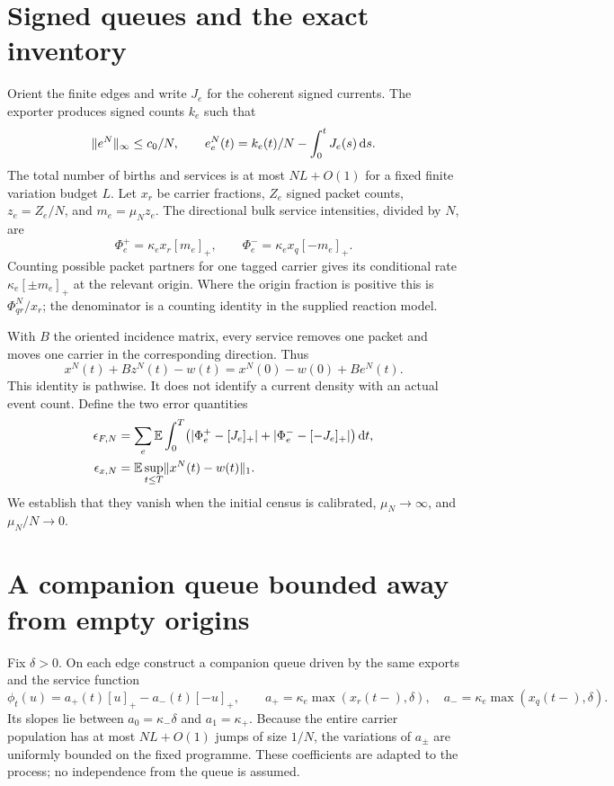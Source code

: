 \section{Signed queues and the exact inventory}\label{section:kinetic:signed-queues-and-the-exact-inventory}
Orient the finite edges and write $J_e$ for the coherent signed currents. The exporter produces signed counts $k_e$ such that
\[
\lVert e^N\rVert_\infty\le c_0/N,
\qquad e_e^N(t)=k_e(t)/N-\int_0^tJ_e(s)\,\mathrm d s.
\]
The total number of births and services is at most $NL+O(1)$ for a fixed finite variation budget $L$. Let $x_r$ be carrier fractions, $Z_e$ signed packet counts, $z_e=Z_e/N$, and $m_e=\mu_Nz_e$. The directional bulk service intensities, divided by $N$, are
\[
\Phi_e^+=\kappa_e x_r[m_e]_+,
\qquad
\Phi_e^-=\kappa_e x_q[-m_e]_+.
\]
Counting possible packet partners for one tagged carrier gives its conditional rate $\kappa_e[\pm m_e]_+$ at the relevant origin. Where the origin fraction is positive this is $\Phi^N_{qr}/x_r$; the denominator is a counting identity in the supplied reaction model.

With $B$ the oriented incidence matrix, every service removes one packet and moves one carrier in the corresponding direction. Thus
\begin{equation}\label{eq:appinventory}
x^N(t)+Bz^N(t)-w(t)
=x^N(0)-w(0)+Be^N(t).
\end{equation}
This identity is pathwise. It does not identify a current density with an actual event count. Define the two error quantities
\begin{align}
\epsilon_{F,N}&=\sum_e\mathbb E\int_0^T
\bigl(|\Phi_e^+-[J_e]_+|+|\Phi_e^--[-J_e]_+|\bigr)\,\mathrm d t,\label{eq:appfluxerr}\\
\epsilon_{x,N}&=\mathbb E\sup_{t\le T}\lVert x^N(t)-w(t)\rVert_1.\label{eq:apppoperr}
\end{align}
We establish that they vanish when the initial census is calibrated, $\mu_N\to\infty$, and $\mu_N/N\to0$.

\section{A companion queue bounded away from empty origins}\label{section:kinetic:a-companion-queue-bounded-away-from-empty-origins}
Fix $\delta>0$. On each edge construct a companion queue driven by the same exports and the service function
\[
\phi_t(u)=a_+(t)[u]_+-a_-(t)[-u]_+,
\qquad
 a_+=\kappa_e\max(x_r(t-),\delta),\quad
 a_-=\kappa_e\max(x_q(t-),\delta).
\]
Its slopes lie between $a_0=\kappa_-\delta$ and $a_1=\kappa_+$. Because the entire carrier population has at most $NL+O(1)$ jumps of size $1/N$, the variations of $a_\pm$ are uniformly bounded on the fixed programme. These coefficients are adapted to the process; no independence from the queue is assumed.

